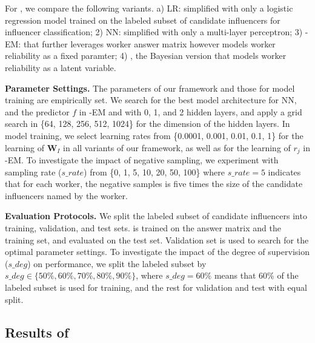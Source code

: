 For \sys, we compare the following variants. a) LR: simplified \sys with only a logistic regression model trained on the labeled subset of candidate influencers for influencer classification; 2) NN: simplified \sys with only a multi-layer perceptron; 3) \sys-EM: \sys that further leverages worker answer matrix however models worker reliability as a fixed paramter; 4) \sys, the Bayesian version that models worker reliability as a latent variable.

\smallskip
\noindent\textbf{Parameter Settings.} The parameters of our framework and those for model training are empirically set. We search for the best model architecture for NN, and the predictor $f$ in \sys-EM and \sys with 0, 1, and 2 hidden layers, and apply a grid search in \{64, 128, 256, 512, 1024\} for the dimension of the hidden layers. In model training, we select learning rates from \{0.0001, 0.001, 0.01, 0.1, 1\} for the learning of $\mathbf{W}_I$ in all variants of our framework, as well as for the learning of $r_j$ in \sys-EM. To investigate the impact of negative sampling, we experiment with sampling rate ($s\_rate$) from \{0, 1, 5, 10, 20, 50, 100\} where $s\_rate=5$ indicates that for each worker, the negative samples is five times the size of the candidate influencers named by the worker. 

\smallskip
\noindent\textbf{Evaluation Protocols.} We split the labeled subset of candidate influencers into training, validation, and test sets. \sys is trained on the answer matrix and the training set, and evaluated on the test set. Validation set is used to search for the optimal parameter settings. To investigate the impact of the degree of supervision ($s\_deg$) on \sys performance, we split the labeled subset by $s\_deg\in \{50\%, 60\%, 70\%, 80\%, 90\%\}$, where $s\_deg = 60\%$ means that 60\% of the labeled subset is used for training, and the rest for validation and test with equal split.



\subsection{Results of \sys}
\label{sec:selfres}

